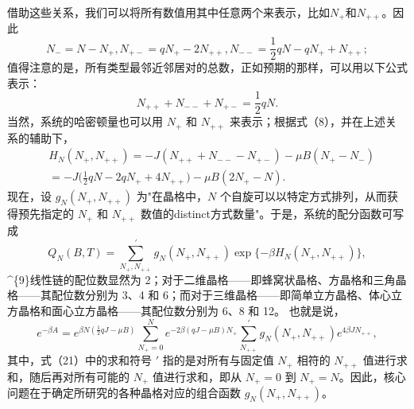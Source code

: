 借助这些关系，我们可以将所有数值用其中任意两个来表示，比如\(N_{+}\)和\(N_{++}\)。因此
\begin{equation}\tag{12.3.16}\label{eq:12.3.16}
N _ { - } = N - N _ { + } ,  N _ { + - } = q N _ { + } - 2 N _ { + + } ,  N _ { -- } = \frac { 1 } { 2 } q N - q N _ { + } + N _ { + + } ;
\end{equation}
值得注意的是，所有类型最邻近邻居对的总数，正如预期的那样，可以用以下公式表示：
\begin{equation}\tag{12.3.17}\label{eq:12.3.17}
N _ { + + } + N _ { -- } + N _ { + - } = \frac { 1 } { 2 } q N .
\end{equation}
当然，系统的哈密顿量也可以用 \(N_{+}\) 和 \(N_{++}\) 来表示；根据式（8），并在上述关系的辅助下，
\begin{equation}\tag{12.3.18}\label{eq:12.3.18}
\begin{array}{rl} & { H _ { N } ( N _ { + } , N _ { + + } ) = - J ( N _ { + + } + N _ { -- } - N _ { + - } ) - \mu B ( N _ { + } - N _ { - } ) } \\& {  = - J \Big ( \frac { 1 } { 2 } q N - 2 q N _ { + } + 4 N _ { + + } \Big ) - \mu B ( 2 N _ { + } - N ) . } \end{array}
\end{equation}
现在，设 \(g_{N}(N_{+},N_{++})\) 为"在晶格中，\(N\) 个自旋可以以特定方式排列，从而获得预先指定的 \(N_{+}\) 和 \(N_{++}\) 数值的distinct方式数量"。于是，系统的配分函数可写成
\begin{equation}\tag{12.3.19}\label{eq:12.3.19}
Q _ { N } ( B , T ) = \sum _ { N _ { + } , N _ { + + } } ^{\prime} g _ { N } ( N _ { + } , N _ { + + } ) \exp \{ - \beta H _ { N } ( N _ { + } , N _ { + + } ) \} ,
\end{equation}
\^{}\{9\}线性链的配位数显然为 2；对于二维晶格——即蜂窝状晶格、方晶格和三角晶格——其配位数分别为 3、4 和 6；而对于三维晶格——即简单立方晶格、体心立方晶格和面心立方晶格——其配位数分别为 6、8 和 12。
也就是说，
\begin{equation}\tag{12.3.20}\label{eq:12.3.20}
e ^{- \beta A} = e ^{\beta N \left( \frac { 1} { 2 } q J - \mu B \right) } \sum _ { N _ { + } = 0 } ^{N} e ^{- 2 \beta ( q J - \mu B ) N _ { +} } \sum _ { N _ { + + } } ^{'} g _ { N } ( N _ { + } , N _ { + + } ) e ^{4 \beta J N _ { + +} } ,
\end{equation}
其中，式（21）中的求和符号 \(\prime\) 指的是对所有与固定值 \(N_{+}\) 相符的 \(N_{++}\) 值进行求和，随后再对所有可能的 \(N_{+}\) 值进行求和，即从 \(N_{+}=0\) 到 \(N_{+}=N\)。因此，核心问题在于确定所研究的各种晶格对应的组合函数 \(g_{N}(N_{+},N_{++})\)。
